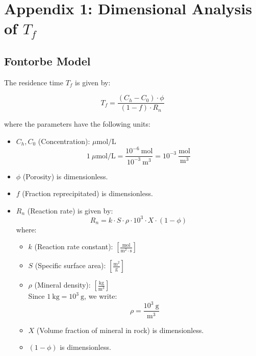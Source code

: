 

\section{Appendix 1: Dimensional Analysis of \(T_f\)}

\subsection*{Fontorbe Model}

The residence time \(T_f\) is given by:

\begin{equation}
    T_f  = \frac{\left(C_h - C_0\right)\cdot\phi}{\left(1-f\right)\cdot R_n}
\end{equation}

where the parameters have the following units:

\begin{itemize}
    \item \( C_h, C_0 \) (Concentration): \( \mu\text{mol}/\text{L} \)
    \[
    1~\mu\text{mol}/\text{L} = \frac{10^{-6}~\text{mol}}{10^{-3}~\text{m}^3} = 10^{-3}~\frac{\text{mol}}{\text{m}^3}
    \]
    \item \( \phi \) (Porosity) is dimensionless.
    \item \( f \) (Fraction reprecipitated) is dimensionless.
    \item \( R_n \) (Reaction rate) is given by:
    \begin{equation}
        R_n = k \cdot S \cdot \rho \cdot 10^3 \cdot X \cdot (1-\phi)
    \end{equation}
    where:
    \begin{itemize}
        \item \( k \) (Reaction rate constant): \( \left[\frac{\text{mol}}{\text{m}^2 \cdot \text{s}}\right] \)
        \item \( S \) (Specific surface area): \( \left[\frac{\text{m}^2}{\text{g}}\right] \)
        \item \( \rho \) (Mineral density): \( \left[\frac{\text{kg}}{\text{m}^3}\right] \) \\
        Since \( 1~\text{kg} = 10^3~\text{g} \), we write:
        \[
        \rho = \frac{10^3~\text{g}}{\text{m}^3}
        \]
        \item \( X \) (Volume fraction of mineral in rock) is dimensionless.
        \item \( (1 - \phi) \) is dimensionless.
    \end{itemize}
\end{itemize}

